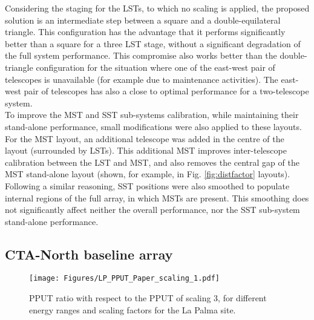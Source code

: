 \documentclass{PoS}
\begin{document}
Considering the staging for the LSTs, to which no scaling is applied, the proposed solution is an intermediate step between a square and a double-equilateral triangle. This configuration has the advantage that it performs significantly better than a square for a three LST stage, without a significant degradation of the full system performance. This compromise also works better than the double-triangle configuration for the situation where one of the east-west pair of telescopes is unavailable (for example due to maintenance activities). The east-west pair of telescopes has also a close to optimal performance for a two-telescope system.\\

To improve the MST and SST sub-systems calibration, while maintaining their stand-alone performance, small modifications were also applied to these layouts. For the MST layout, an additional telescope was added in the centre of the layout (surrounded by LSTs). This additional MST improves inter-telescope calibration between the LST and MST, and also removes the central gap of the MST stand-alone layout (shown, for example, in Fig. \ref{fig:distfactor} layouts). Following a similar reasoning, SST positions were also smoothed to populate internal regions of the full array, in which MSTs are present. This smoothing does not significantly affect neither the overall performance, nor the SST sub-system stand-alone performance.




\subsection{CTA-North baseline array}\label{north}


\begin{figure}[t]
\begin{center}
\centering\texttt{[image: Figures/LP\_PPUT\_Paper\_scaling\_1.pdf]}
\caption{PPUT ratio with respect to the PPUT of scaling 3, for different energy ranges and scaling factors for the La Palma site.}
\label{fig:PPUTLaPalma}
\end{center}
\end{figure}
\end{document}
